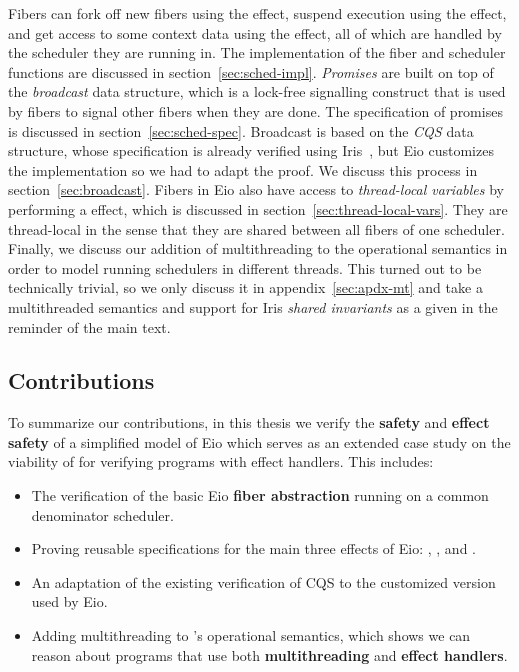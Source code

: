 Fibers can fork off new fibers using the \efork{} effect, suspend execution using the \esuspend{} effect, and get access to some context data using the \egetctx{} effect,
all of which are handled by the scheduler they are running in.
The implementation of the fiber and scheduler functions are discussed in section~\ref{sec:sched-impl}.
\emph{Promises} are built on top of the \emph{broadcast} data structure, which is a lock-free signalling construct that is used by fibers to signal other fibers when they are done.
The specification of promises is discussed in section~\ref{sec:sched-spec}.
Broadcast is based on the \emph{CQS} data structure, whose specification is already verified using Iris~\cite{koval2023cqs}, but Eio customizes the implementation so we had to adapt the proof.
We discuss this process in section~\ref{sec:broadcast}.
Fibers in Eio also have access to \emph{thread-local variables} by performing a \egetctx{} effect, which is discussed in section~\ref{sec:thread-local-vars}.
They are thread-local in the sense that they are shared between all fibers of one scheduler.
Finally, we discuss our addition of multithreading to the \hh{} operational semantics in order to model running schedulers in different threads.
This turned out to be technically trivial, so we only discuss it in appendix~\ref{sec:apdx-mt} and take a multithreaded semantics and support for Iris \emph{shared invariants} as a given in the reminder of the main text.

\subsection{Contributions}
\label{sec:intro-contributions}

To summarize our contributions, in this thesis we verify the \textbf{safety} and \textbf{effect safety} of a simplified model of Eio which serves as an extended case study on the viability of \hazel{} for verifying programs with effect handlers.
This includes:

\begin{itemize}
    \item The verification of the basic Eio \textbf{fiber abstraction} running on a common denominator scheduler.
    \item Proving reusable specifications for the main three effects of Eio: \efork{}, \esuspend{}, and \egetctx{}.
    \item An adaptation of the existing verification of CQS to the customized version used by Eio.
    \item Adding multithreading to \hh{}'s operational semantics, which shows we can reason about programs that use both \textbf{multithreading} and \textbf{effect handlers}.
\end{itemize}
